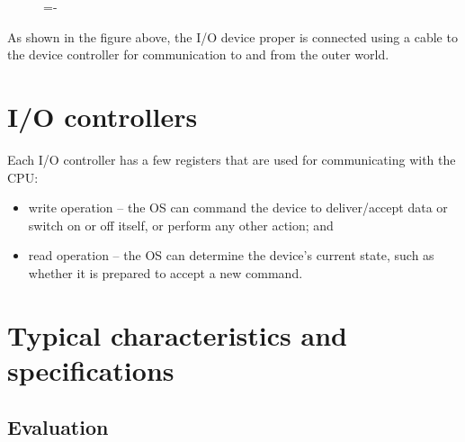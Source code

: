 \documentclass[a4paper]{systems-software}
\begin{document}
\begin{figure}[H]
  \lineskip=-\fboxrule
\end{figure}

As shown in the figure above, the I/O device proper is connected using a cable to the device controller for communication to and from the outer world.


\section*{I/O controllers}

Each I/O controller has a few registers that are used for communicating with the CPU:
\begin{itemize}
	\item write operation -- the OS can command the device to deliver/accept data or switch on or off itself, or perform any other action; and
	\item read operation -- the OS can determine the device's current state, such as whether it is prepared to accept a new command.
\end{itemize}


\section*{Typical characteristics and specifications}

\subsection*{Evaluation}
\end{document}
